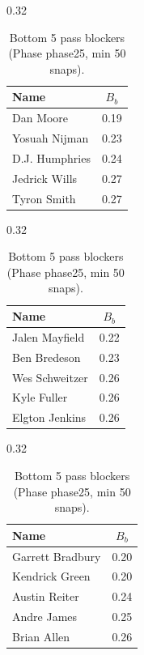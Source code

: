 \begin{table}[h!]
\centering
\begin{subtable}{0.32\textwidth}
\centering
\footnotesize
\begin{tabular}{lc}
\toprule
Name & $B_b$ \\
\midrule
Dan Moore & 0.19 \\
Yosuah Nijman & 0.23 \\
D.J. Humphries & 0.24 \\
Jedrick Wills & 0.27 \\
Tyron Smith & 0.27 \\
\bottomrule
\end{tabular}
\caption{T}
\end{subtable}
\hfill
\begin{subtable}{0.32\textwidth}
\centering
\footnotesize
\begin{tabular}{lc}
\toprule
Name & $B_b$ \\
\midrule
Jalen Mayfield & 0.22 \\
Ben Bredeson & 0.23 \\
Wes Schweitzer & 0.26 \\
Kyle Fuller & 0.26 \\
Elgton Jenkins & 0.26 \\
\bottomrule
\end{tabular}
\caption{G}
\end{subtable}
\hfill
\begin{subtable}{0.32\textwidth}
\centering
\footnotesize
\begin{tabular}{lc}
\toprule
Name & $B_b$ \\
\midrule
Garrett Bradbury & 0.20 \\
Kendrick Green & 0.20 \\
Austin Reiter & 0.24 \\
Andre James & 0.25 \\
Brian Allen & 0.26 \\
\bottomrule
\end{tabular}
\caption{C}
\end{subtable}
\caption{Bottom 5 pass blockers (Phase phase25, min 50 snaps).}
\label{tab:blocker_pm_phase25_bot}
\end{table}
